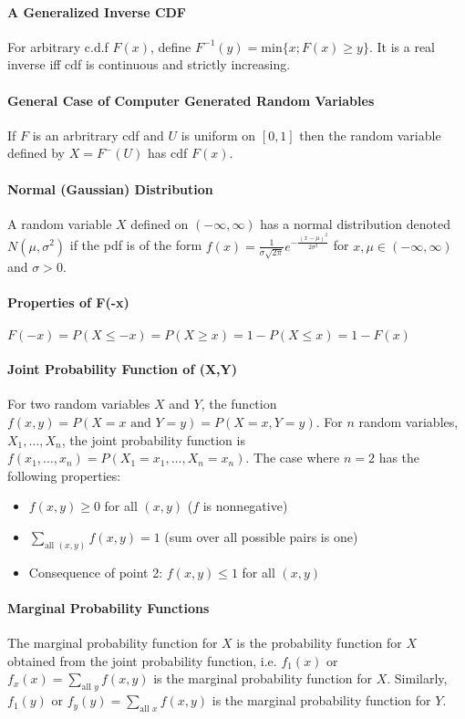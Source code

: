 \documentclass[10pt,letter]{article}
\begin{document}
\paragraph{A Generalized Inverse CDF} For arbitrary c.d.f $F(x)$, define $F^{-1}(y)=\text{min}\{x;F(x)\geq y\}$. It is a real inverse iff cdf is continuous and strictly increasing. 

\paragraph{General Case of Computer Generated Random Variables} If $F$ is an arbritrary cdf and $U$ is uniform on $[0,1]$ then the random variable defined by $X=F^{-}(U)$ has cdf $F(x)$.

\paragraph{Normal (Gaussian) Distribution} A random variable $X$ defined on $(-\infty, \infty)$ has a normal distribution denoted $N(\mu, \sigma^2)$ if the pdf is of the form $f(x)=\frac{1}{\sigma\sqrt{2\pi}}e^{-\frac{(x-\mu)^2}{2\sigma^2}}$ for $x,\mu \in(-\infty, \infty)$ and $\sigma>0$. 

\paragraph{Properties of F(-x)} $F(-x)=P(X\leq-x)=P(X\geq x)=1-P(X\leq x) = 1 - F(x)$

\paragraph{Joint Probability Function of (X,Y)} For two random variables $X$ and $Y$, the function $f(x,y)=P(X=x\text{ and }Y = y)=P(X=x, Y=y)$. For $n$ random variables, $X_1,\ldots,X_n$, the joint probability function is $f(x_1,\ldots,x_n)=P(X_1=x_1,\ldots,X_n=x_n)$. The case where $n=2$ has the following properties: 
\begin{itemize}
    \item $f(x,y)\geq0$ for all $(x,y)$ ($f$ is nonnegative)
    \item $\sum_{\text{all }(x,y)}f(x,y)=1$ (sum over all possible pairs is one)
    \item Consequence of point 2: $f(x,y)\leq1$ for all $(x,y)$
\end{itemize}

\paragraph{Marginal Probability Functions} The marginal probability function for $X$ is the probability function for $X$ obtained from the joint probability function, i.e. $f_1(x)$ or $f_x(x)=\sum_{\text{all }y}f(x,y)$ is the marginal probability function for $X$. Similarly, $f_1(y)$ or $f_y(y)=\sum_{\text{all }x}f(x,y)$ is the marginal probability function for $Y$.
\end{document}
